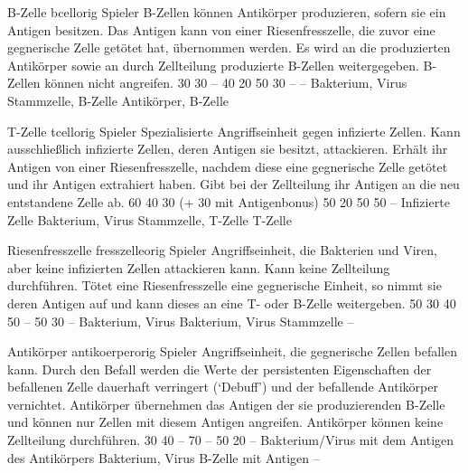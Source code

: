 \cellentry
  {B-Zelle}
  {bcellorig}
  {Spieler}
  {B-Zellen können Antikörper produzieren, sofern sie ein Antigen besitzen. Das
   Antigen kann von einer Riesenfresszelle, die zuvor eine gegnerische Zelle
   getötet hat, übernommen werden. Es wird an die produzierten Antikörper
   sowie an durch Zellteilung produzierte B-Zellen weitergegeben. B-Zellen
   können nicht angreifen.
  }
  {30} %
  {30} %
  {--} %
  {40} %
  {20} %
\cellentryctd
  {50} %
  {30} %
  {--} %
  {--} %
  {Bakterium, Virus} %
  {Stammzelle, B-Zelle} %
  {Antikörper, B-Zelle} %

\cellentry
  {T-Zelle}
  {tcellorig}
  {Spieler}
  {Spezialisierte Angriffseinheit gegen infizierte Zellen. Kann ausschließlich
   infizierte Zellen, deren Antigen sie besitzt, attackieren. Erhält ihr Antigen
   von einer Riesenfresszelle, nachdem diese eine gegnerische Zelle getötet
   und ihr Antigen extrahiert haben. Gibt bei der Zellteilung ihr Antigen
   an die neu entstandene Zelle ab.
  }
  {60} %
  {40} %
  {30 (+ 30 mit Antigenbonus)} %
  {50} %
  {20} %
\cellentryctd
  {50} %
  {50} %
  {--} %
  {Infizierte Zelle} %
  {Bakterium, Virus} %
  {Stammzelle, T-Zelle} %
  {T-Zelle} %

\cellentry
  {Riesenfresszelle}
  {fresszelleorig}
  {Spieler}
  {Angriffseinheit, die Bakterien und Viren, aber keine infizierten Zellen
   attackieren kann. Kann keine Zellteilung durchführen. Tötet eine
   Riesenfresszelle eine gegnerische Einheit, so nimmt sie deren Antigen
   auf und kann dieses an eine T- oder B-Zelle weitergeben.
  }
  {50} %
  {30} %
  {40} %
  {50} %
  {--} %
\cellentryctd
  {50} %
  {30} %
  {--} %
  {Bakterium, Virus} %
  {Bakterium, Virus} %
  {Stammzelle} %
  {--} %

\cellentry
  {Antikörper}
  {antikoerperorig}
  {Spieler}
  {Angriffseinheit, die gegnerische Zellen befallen kann. Durch den Befall
   werden die Werte der persistenten Eigenschaften der befallenen Zelle
   dauerhaft verringert (\enquote*{Debuff}) und der befallende Antikörper
   vernichtet. Antikörper übernehmen das Antigen der sie produzierenden B-Zelle
   und können nur Zellen mit diesem Antigen angreifen. Antikörper können keine
   Zellteilung durchführen.
  }
  {30} %
  {40} %
  {--} %
  {70} %
  {--} %
\cellentryctd
  {50} %
  {20} %
  {--} %
  {Bakterium/Virus mit dem Antigen des Antikörpers} %
  {Bakterium, Virus} %
  {B-Zelle mit Antigen} %
  {--} %

